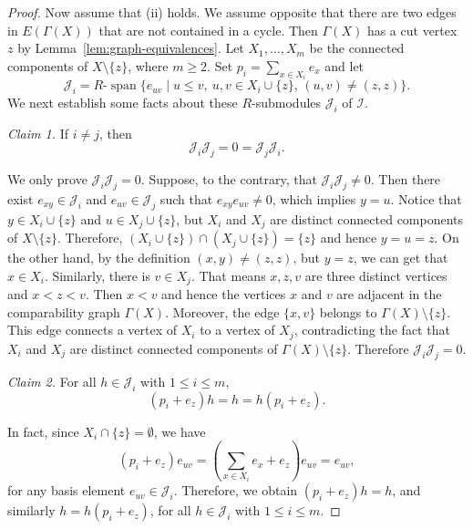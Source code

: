 \documentclass[10pt,a4paper]{amsart}
\newcommand{\I}{\mathcal I}
\newcommand{\Span}{\operatorname{span}}
\begin{document}
\begin{proof}
Now assume that (ii) holds. We assume opposite that there are two edges in $E(\Gamma(X))$ that are not contained in a cycle.
Then $\Gamma(X)$ has a cut vertex $z$ by Lemma~\ref{lem:graph-equivalences}.
Let $X_1,\ldots,X_m$ be the connected components of $X\setminus\{z\}$, where $m\geq2$.
Set $p_i=\sum_{x\in X_i}e_x$ and let
\begin{equation*}
\mathcal{J}_i
=R\text{-}\Span\{e_{uv}\mid u\leq v,\ u,v\in X_i\cup\{z\},\,
(u,v)\neq(z,z)\}.
\end{equation*}
We next establish some facts about these $R$-submodules $\mathcal{J}_i$ of $\I$.

\smallskip
\noindent\emph{Claim 1.}
If $i\neq j$, then
\begin{equation}\label{eq:Ji-cross-zero}
\mathcal J_i\mathcal J_j=0=\mathcal J_j\mathcal J_i.
\end{equation}

We only prove $\mathcal J_i\mathcal J_j=0$. Suppose, to the contrary, that $\mathcal J_i\mathcal J_j\neq0$.
Then there exist $e_{xy}\in\mathcal J_i$ and $e_{uv}\in\mathcal J_j$ such that
$e_{xy}e_{uv}\neq 0$, which implies $y=u$. Notice that $y\in X_i\cup\{z\}$ and $u\in X_j\cup\{z\}$, but
$X_i$ and $X_j$ are distinct connected components of $X\setminus\{z\}$.
Therefore, $(X_i\cup\{z\})\cap(X_j\cup\{z\})=\{z\}$ and hence $y=u=z$. On the other hand,
by the definition $(x,y)\neq (z,z)$, but $y=z$, we can get that $x\in X_i$.
Similarly, there is $v\in X_j$. That means $x,z,v$ are three distinct vertices and $x<z<v$.
Then $x<v$ and hence the vertices $x$ and $v$ are
adjacent in the comparability graph $\Gamma(X)$. Moreover, the edge $\{x,v\}$ belongs to
$\Gamma(X)\setminus\{z\}$. This edge connects a vertex of $X_i$ to
a vertex of $X_j$, contradicting the fact that $X_i$ and $X_j$ are
distinct connected components of $\Gamma(X)\setminus\{z\}$.
Therefore $\mathcal J_i\mathcal J_j=0$.

\smallskip
\noindent\emph{Claim 2.}
For all $h\in\mathcal J_i$ with $1\leq i\leq m$,
\begin{equation}\label{eq:local-unit}
(p_i+e_z)h=h=h(p_i+e_z).
\end{equation}

In fact, since $X_i\cap \{z\}=\emptyset$, we have
\[
(p_i+e_z)e_{uv}=\left(\sum_{x\in X_i}e_x+e_z\right)e_{uv}=e_{uv},
\]
for any basis element $e_{uv}\in \mathcal J_i$. Therefore, we obtain $(p_i+e_z)h=h$, and
similarly $h=h(p_i+e_z)$, for all $h\in\mathcal J_i$ with $1\leq i\leq m$.


\end{proof}
\end{document}
